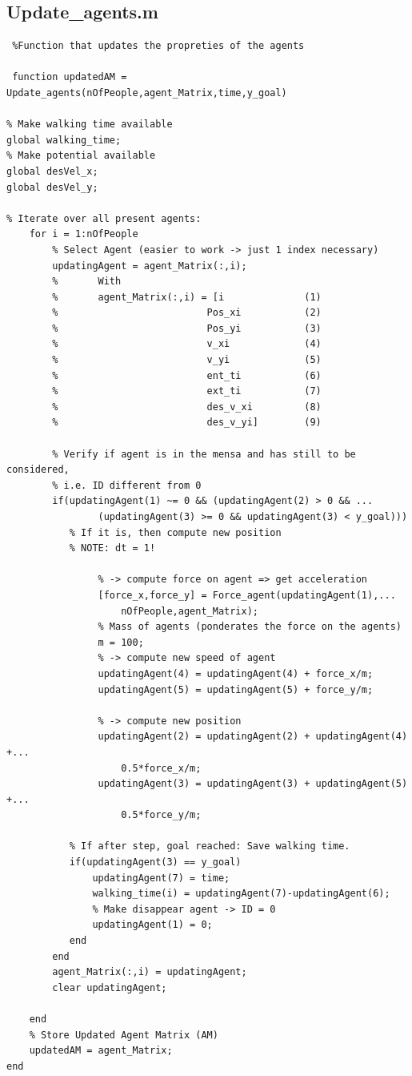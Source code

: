 \documentclass[11pt]{article}
\begin{document}
\subsection*{Update\_agents.m}
\begin{lstlisting}[frame=lines]
%%Updating agents function
 %Function that updates the propreties of the agents
 
 function updatedAM = Update_agents(nOfPeople,agent_Matrix,time,y_goal)

% Make walking time available
global walking_time;
% Make potential available
global desVel_x;
global desVel_y;

% Iterate over all present agents:
    for i = 1:nOfPeople
        % Select Agent (easier to work -> just 1 index necessary)
        updatingAgent = agent_Matrix(:,i);
        %       With        
        %       agent_Matrix(:,i) = [i              (1)
        %                          Pos_xi           (2)
        %                          Pos_yi           (3)
        %                          v_xi             (4)
        %                          v_yi             (5)
        %                          ent_ti           (6)
        %                          ext_ti           (7)
        %                          des_v_xi         (8)
        %                          des_v_yi]        (9)

        % Verify if agent is in the mensa and has still to be considered,
        % i.e. ID different from 0
        if(updatingAgent(1) ~= 0 && (updatingAgent(2) > 0 && ...
                (updatingAgent(3) >= 0 && updatingAgent(3) < y_goal)))
           % If it is, then compute new position
           % NOTE: dt = 1!
           
                % -> compute force on agent => get acceleration
                [force_x,force_y] = Force_agent(updatingAgent(1),...
                    nOfPeople,agent_Matrix);
				% Mass of agents (ponderates the force on the agents)
				m = 100;
                % -> compute new speed of agent
                updatingAgent(4) = updatingAgent(4) + force_x/m;
                updatingAgent(5) = updatingAgent(5) + force_y/m;
                
                % -> compute new position
                updatingAgent(2) = updatingAgent(2) + updatingAgent(4) +...
                    0.5*force_x/m;
                updatingAgent(3) = updatingAgent(3) + updatingAgent(5) +...
                    0.5*force_y/m;
                     
           % If after step, goal reached: Save walking time.
           if(updatingAgent(3) == y_goal)
               updatingAgent(7) = time;
               walking_time(i) = updatingAgent(7)-updatingAgent(6);
               % Make disappear agent -> ID = 0
               updatingAgent(1) = 0;
           end   
        end
        agent_Matrix(:,i) = updatingAgent;
        clear updatingAgent;
        
    end
    % Store Updated Agent Matrix (AM)
    updatedAM = agent_Matrix;
end
\end{lstlisting}
\end{document}
